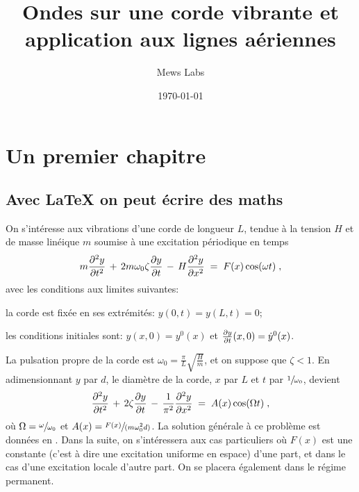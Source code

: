 \documentclass[a4paper, french, 10pt, twoside, openright]{report}
\title{Ondes sur une corde vibrante et application aux lignes aériennes}
\author{Mews Labs}
\date{\today}
\newcommand{\w}{\omega}
\newcommand{\wz}{\omega_0}
\begin{document}

\mopen


\chapter{Un premier chapitre}



\section{Avec \LaTeX{} on peut écrire des maths}

On s'intéresse aux vibrations d'une corde de longueur $L$, tendue à la tension $H$ et de masse linéique $m$
soumise à une excitation périodique en temps
%
\begin{equation}
    \label{eq:wave}
    m\ddpart{y}{t} \,+\, 2m\wz\zeta\dpart{y}{t} \,-\, H \ddpart{y}{x} \;=\; F(x)\cos(\w t) \;,
\end{equation}
%
avec les conditions aux limites suivantes:
%
\begin{mitemize}
    \item la corde est fixée en ses extrémités: $y(0, t) = y(L, t) = 0$;
    \item les conditions initiales sont: $y(x, 0) = y^0(x)$ et $\frac{\partial y}{\partial t}(x, 0) = \dot{y}^0(x)$.
\end{mitemize}
%
La pulsation propre de la corde est $\wz=\frac{\pi}{L}\sqrt{\frac{H}{m}}$, et on suppose que $\zeta < 1$.
En adimensionnant $y$ par $d$, le diamètre de la corde, $x$ par $L$ et $t$ par $\sfrac{1}{\wz}$, 
devient
%
\begin{equation}
    \label{eq:wadim}
    \frac{\partial^{2} y}{\partial {t}^{2}} \,+\, 2\zeta\frac{\partial y}{\partial t} \,-\, \frac{1}{\pi^2} \frac{\partial^{2} y}{\partial {x}^{2}} \;=\; A(x)\cos(\Omega t) \;,
\end{equation}
%
où $\Omega = \sfrac{\w}{\wz}$ et $A(x) = \sfrac{F(x)}{(m\wz^2 d)}$. La solution générale à ce problème est
données en . Dans la suite, on s'intéressera aux cas particuliers où $F(x)$ est une constante
(c'est à dire une excitation uniforme en espace) d'une part, et dans le cas d'une excitation locale d'autre part.
On se placera également dans le régime permanent.
\end{document}

